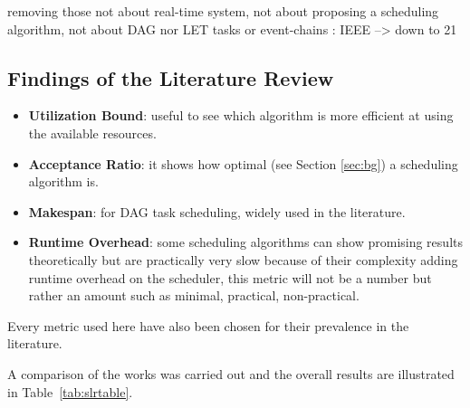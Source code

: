             removing those not about real-time system,
            not about proposing a scheduling algorithm,
            not about DAG nor LET tasks or event-chains : IEEE --> down to 21

\paragraph{}

\subsection{Findings of the Literature Review}

\begin{itemize}
    \item \textbf{Utilization Bound}: useful to see which algorithm is more efficient at using the available resources.
    \item \textbf{Acceptance Ratio}: it shows how optimal (see Section \ref{sec:bg}) a scheduling algorithm is.
    \item \textbf{Makespan}: for DAG task scheduling, widely used in the literature.
    \item \textbf{Runtime Overhead}: some scheduling algorithms can show promising results theoretically but are practically very slow because 
    of their complexity adding runtime overhead on the scheduler, this metric will not be a number but rather an amount such as minimal, practical, non-practical.
\end{itemize}
Every metric used here have also been chosen for their prevalence in the literature.

A comparison of the works was carried out and the overall results are illustrated in Table~\ref{tab:slrtable}.
 

